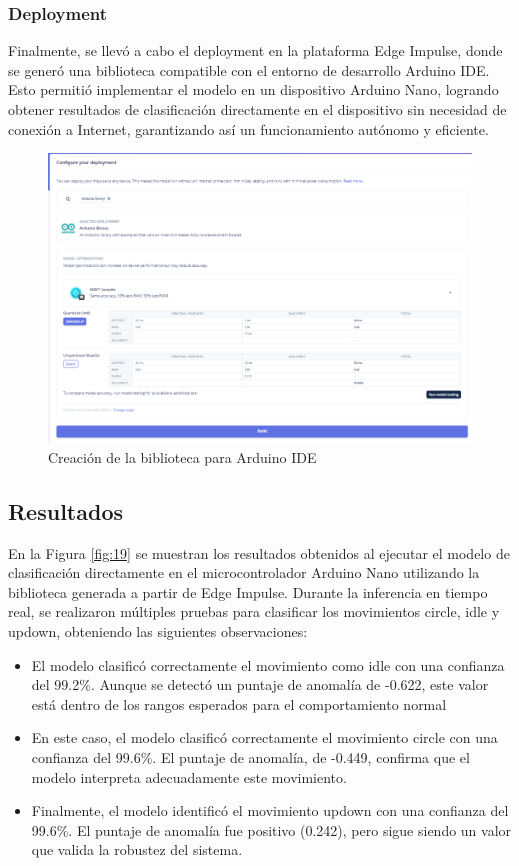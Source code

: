 \documentclass[12pt,a4paper]{article}
\begin{document}
\subsubsection{Deployment}
Finalmente, se llevó a cabo el deployment en la plataforma Edge Impulse, donde se generó una biblioteca compatible con el entorno de desarrollo Arduino IDE. Esto permitió implementar el modelo en un dispositivo Arduino Nano, logrando obtener resultados de clasificación directamente en el dispositivo sin necesidad de conexión a Internet, garantizando así un funcionamiento autónomo y eficiente.
\begin{figure}[H]
    \centering
    \includegraphics[width=0.6\linewidth]{Imagenes/deployment.png}
    \caption{Creación de la biblioteca para Arduino IDE}
    \label{fig:18}
\end{figure}

\subsection{Resultados}

En la Figura \ref{fig:19} se muestran los resultados obtenidos al ejecutar el modelo de clasificación directamente en el microcontrolador Arduino Nano utilizando la biblioteca generada a partir de Edge Impulse. Durante la inferencia en tiempo real, se realizaron múltiples pruebas para clasificar los movimientos circle, idle y updown, obteniendo las siguientes observaciones:
\begin{itemize}
    \item El modelo clasificó correctamente el movimiento como idle con una confianza del 99.2\%. Aunque se detectó un puntaje de anomalía de -0.622, este valor está dentro de los rangos esperados para el comportamiento normal
    \item En este caso, el modelo clasificó correctamente el movimiento circle con una confianza del 99.6\%. El puntaje de anomalía, de -0.449, confirma que el modelo interpreta adecuadamente este movimiento.
    \item Finalmente, el modelo identificó el movimiento updown con una confianza del 99.6\%. El puntaje de anomalía fue positivo (0.242), pero sigue siendo un valor que valida la robustez del sistema.
\end{itemize}
\end{document}
